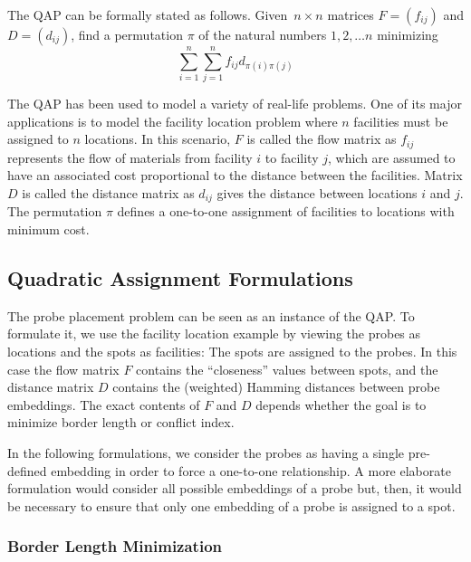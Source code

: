 \documentclass{bioinfo}
\begin{document}
The QAP can be formally stated as follows. Given~$n \times n$ matrices $F = (f_{ij})$ and $D = (d_{ij})$, find a permutation $\pi$ of the natural numbers $1, 2, \ldots n$ minimizing
\begin{equation}
\label{eq:qap_def}
\sum_{i=1}^{n} \sum_{j=1}^{n} f_{ij} d_{\pi(i)\pi(j)}
\end{equation}

The QAP has been used to model a variety of real-life problems. One of its major applications is to model the facility location problem where $n$ facilities must be assigned to $n$ locations. In this scenario, $F$ is called the flow matrix as $f_{ij}$ represents the flow of materials from facility $i$ to facility $j$, which are assumed to have an associated cost proportional to the distance between the facilities. Matrix $D$ is called the distance matrix as $d_{ij}$ gives the distance between locations $i$ and $j$. The permutation $\pi$ defines a one-to-one assignment of facilities to locations with minimum cost.

\subsection{Quadratic Assignment Formulations}
\label{sec:qap_form}

The probe placement problem can be seen as an instance of the QAP. To
formulate it, we use the facility location example by viewing the
probes as locations and the spots as facilities: The spots are
assigned to the probes. In this case the flow matrix $F$ contains the
``closeness'' values between spots, and the distance matrix $D$
contains the (weighted) Hamming distances between probe embeddings.
The exact contents of $F$ and $D$ depends whether the goal is to
minimize border length or conflict index.

 In the following formulations, we consider the probes as having a single pre-defined embedding in order to force a one-to-one relationship.
 A more elaborate formulation would consider all possible embeddings of a probe but, then, it would be necessary to ensure that only one embedding of a probe is assigned to a spot.

\subsubsection{Border Length Minimization}
\end{document}

